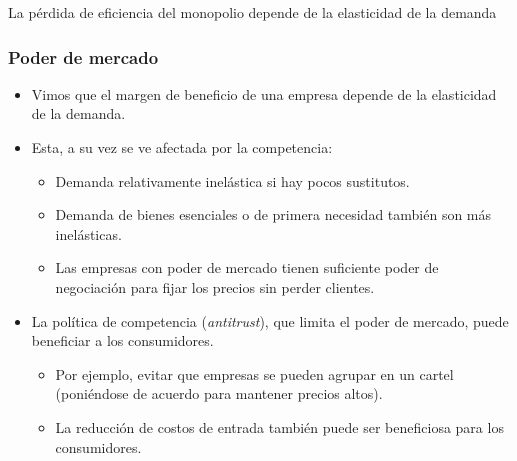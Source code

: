 \documentclass{beamer}
\begin{document}
\begin{frame}{La pérdida de eficiencia del
monopolio depende de la elasticidad de
la demanda}
\begin{center}
\begin{figure}[H]
\begin{center}
\end{center}
\end{figure}
\end{center}
\end{frame}

\begin{frame}
\frametitle{Poder de mercado}
\begin{itemize}
    \item Vimos que el margen de beneficio de una empresa depende de la elasticidad de la demanda. \vspace{2mm}
        \item Esta, a su vez se ve afectada por la competencia:     
        \begin{itemize}
        \item Demanda relativamente inelástica si hay pocos sustitutos.
        \item Demanda de bienes esenciales o de primera necesidad también son más inelásticas.
        \item Las empresas con poder de mercado tienen suficiente poder de negociación para fijar los precios sin perder clientes. \vspace{2mm}
    \end{itemize}
    \item La política de competencia (\textit{antitrust}), que limita el poder de mercado, puede beneficiar a los consumidores. 
    \begin{itemize}
        \item Por ejemplo, evitar que empresas se pueden agrupar en un cartel (poniéndose de acuerdo para mantener precios altos).
        \item La reducción de costos de entrada también puede ser beneficiosa para los consumidores.
    \end{itemize}
\end{itemize}
\end{frame}
\end{document}
